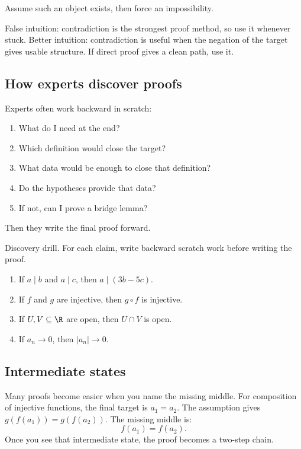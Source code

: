 Assume such an object exists, then force an impossibility.

\begin{trapbox}
False intuition: contradiction is the strongest proof method, so use it
whenever stuck. Better intuition: contradiction is useful when the negation of
the target gives usable structure. If direct proof gives a clean path, use it.
\end{trapbox}

\subsection{How experts discover proofs}

Experts often work backward in scratch:

\begin{enumerate}
\item What do I need at the end?
\item Which definition would close the target?
\item What data would be enough to close that definition?
\item Do the hypotheses provide that data?
\item If not, can I prove a bridge lemma?
\end{enumerate}

Then they write the final proof forward.

\begin{labbox}
Discovery drill. For each claim, write backward scratch work before writing the
proof.
\begin{enumerate}
\item If $a\mid b$ and $a\mid c$, then $a\mid(3b-5c)$.
\item If $f$ and $g$ are injective, then $g\circ f$ is injective.
\item If $U,V\subseteq\R$ are open, then $U\cap V$ is open.
\item If $a_n\to0$, then $|a_n|\to0$.
\end{enumerate}
\end{labbox}

\subsection{Intermediate states}

Many proofs become easier when you name the missing middle. For composition of
injective functions, the final target is $a_1=a_2$. The assumption gives
$g(f(a_1))=g(f(a_2))$. The missing middle is:
\[
f(a_1)=f(a_2).
\]
Once you see that intermediate state, the proof becomes a two-step chain.

